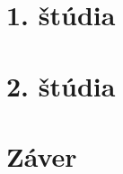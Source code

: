 \documentclass[10pt,oneside,slovak,a4paper]{article}
\begin{document}
\section{1. štúdia} \label{dolezita}




\section{2. štúdia} \label{dolezitejsia}




\section{Záver} \label{zaver} %






\end{document}
